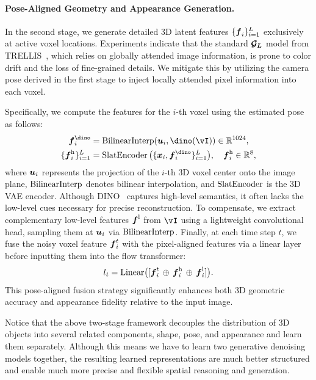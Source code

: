 \documentclass[../../book-main.tex]{subfiles}
\begin{document}
\paragraph{Pose-Aligned Geometry and Appearance Generation.}
In the second stage, we generate detailed 3D latent features $\{
\boldsymbol{f}_i \}_{i=1}^{L}$ exclusively at active voxel locations.
Experiments indicate that the standard $\boldsymbol{\mathcal{G}_{L}}$ model from
TRELLIS~\citep{xiang2025structured}, which relies on globally
attended image information, is prone to color drift and the loss of
fine-grained details. We mitigate this by utilizing the camera pose
derived in the first stage to inject locally attended pixel
information into each voxel.

Specifically, we compute the features for the $i$-th voxel using the
estimated pose as follows:
\begin{equation}
\begin{aligned}
\feat^\dino_{i} &= \interp(\pixcoord_i, \dino(\image)) \in \mathbb{R}^{1024}, \\
\{\feat^{\high}_{i}\}_{i=1}^{\numpts} &= \slatenc\big(\{\point_i,
\feat^\dino_i\}_{i=1}^{\numpts}\big), \quad \feat^{\high}_{i} \in
\mathbb{R}^{8},
\end{aligned}
\label{eq:latent}
\end{equation}
where $\boldsymbol{u}_i$ represents the projection of the $i$-th 3D voxel
center onto the image plane, $\operatorname{BilinearInterp}$ denotes bilinear
interpolation, and $\operatorname{SlatEncoder}$ is the 3D VAE encoder. Although
DINO~\citep{oquab2023dinov2} captures high-level semantics, it often
lacks the low-level cues necessary for precise reconstruction. To
compensate, we extract complementary low-level features
$\boldsymbol{f}^{\mathrm{l}}$ from $\image$ using a lightweight convolutional head,
sampling them at $\boldsymbol{u}_i$ via $\operatorname{BilinearInterp}$. Finally, at each time
step $t$, we fuse the noisy voxel feature $\boldsymbol{f}_i^{t}$ with the
pixel-aligned features via a linear layer before inputting them into
the flow transformer:
\begin{equation}
l_t = \mathrm{Linear}\big([\boldsymbol{f}_i^{t}\,\oplus\, \boldsymbol{f}^{\mathrm{h}}_{i}
\,\oplus\, \boldsymbol{f}^{\mathrm{l}}_{i}]\big).
\end{equation}
This pose-aligned fusion strategy significantly enhances both 3D
geometric accuracy and appearance fidelity relative to the input image.

\begin{remark}
Notice that the above two-stage framework decouples the distribution
of 3D objects into several related components, shape, pose, and
appearance and learn them separately. Although this means we have to
learn two generative denoising models together, the resulting learned
representations are much better structured and enable much more
precise and flexible spatial reasoning and generation.
\end{remark}
\end{document}
